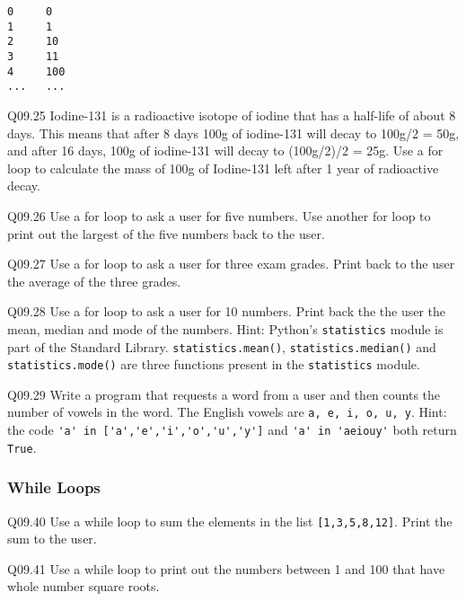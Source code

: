 \documentclass{book}
\newenvironment{problems}{}{}  %
\newcommand{\passthrough}[1]{#1}
\begin{document}
\begin{problems}
\begin{lstlisting}
0     0
1     1
2     10
3     11
4     100
...   ...
\end{lstlisting}

Q09.25 Iodine-131 is a radioactive isotope of iodine that has a
half-life of about 8 days. This means that after 8 days 100g of
iodine-131 will decay to 100g/2 = 50g, and after 16 days, 100g of
iodine-131 will decay to (100g/2)/2 = 25g. Use a for loop to calculate
the mass of 100g of Iodine-131 left after 1 year of radioactive decay.

Q09.26 Use a for loop to ask a user for five numbers. Use another for
loop to print out the largest of the five numbers back to the user.

Q09.27 Use a for loop to ask a user for three exam grades. Print back to
the user the average of the three grades.

Q09.28 Use a for loop to ask a user for 10 numbers. Print back the the
user the mean, median and mode of the numbers. Hint: Python's
\passthrough{\lstinline!statistics!} module is part of the Standard
Library. \passthrough{\lstinline!statistics.mean()!},
\passthrough{\lstinline!statistics.median()!} and
\passthrough{\lstinline!statistics.mode()!} are three functions present
in the \passthrough{\lstinline!statistics!} module.

Q09.29 Write a program that requests a word from a user and then counts
the number of vowels in the word. The English vowels are
\passthrough{\lstinline!a, e, i, o, u, y!}. Hint: the code
\passthrough{\lstinline!'a' in ['a','e','i','o','u','y']!} and
\passthrough{\lstinline!'a' in 'aeiouy'!} both return
\passthrough{\lstinline!True!}.
        \end{problems}

    




    
        \hypertarget{while-loops}{%
\subsubsection{While Loops}\label{while-loops}}
    




    
        Q09.40 Use a while loop to sum the elements in the list
\passthrough{\lstinline![1,3,5,8,12]!}. Print the sum to the user.

Q09.41 Use a while loop to print out the numbers between 1 and 100 that
have whole number square roots.
\end{document}
